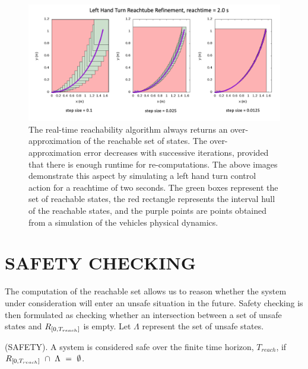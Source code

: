 \documentclass[manuscript,screen,review]{acmart}
\begin{document}
\begin{figure}[htbp]%
  \centering
  \includegraphics[width=\linewidth]{figures/refinement_reachset.png}
  \caption{The real-time reachability algorithm always returns an over-approximation of the reachable set of states. The over-approximation error decreases with successive iterations, provided that there is enough runtime for re-computations. The above images demonstrate this aspect by simulating a left hand turn control action for a reachtime of two seconds. The green boxes represent the set of reachable states, the red rectangle represents the interval hull of the reachable states, and the purple points are points obtained from a simulation of the vehicles physical dynamics.}
  \label{fig:reach_refine}
\end{figure}%



\section{SAFETY CHECKING}
The computation of the reachable set allows us to reason whether the system under consideration will enter an unsafe situation in the future. Safety checking is then formulated as checking whether an intersection between a set of unsafe states and $\mathnormal{R}_{[0,T_{reach}]}$ is empty. Let $\Lambda$ represent the set of unsafe states.\smallskip

\begin{definition}%
(SAFETY). A system is considered safe over the finite time horizon, $T_{reach}$, if  $\mathnormal{R}_{[0,T_{reach}]} \  \cap \ \Lambda \ = \ \emptyset$.
\end{definition}%
%
\end{document}
